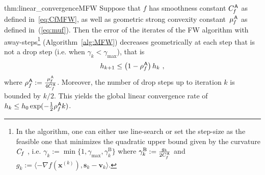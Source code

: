\documentclass{article} %
\newcommand{\stepsize}{\gamma}
\newcommand{\stepmax}{\stepsize_{\textrm{max}}} %
\newcommand{\stepbound}{\stepsize^\textrm{B}} %
\newcommand{\away}{{\hspace{0.06em}\textsf{A}}}
\newcommand{\Cf}{C_{\hspace{-0.08em}f}}
\newcommand{\CfMFW}{C_{\hspace{-0.08em}f}^\away}
\newcommand{\strongConvMFW}{\mu_{\hspace{-0.08em}f}^\away}
\newcommand{\x}{\bm{x}}
\newcommand{\s}{\bm{s}}
\newcommand{\vv}{\bm{v}} %
\newcommand{\0}{\mathbf{0}} %
\begin{document}
\begin{reptheorem}{thm:linear_convergenceMFW}
Suppose that $f$ has smoothness constant $\CfMFW$ as defined in~\eqref{eq:CfMFW}, as well as geometric strong convexity constant~$\strongConvMFW$ as defined in~(\ref{eq:muf}).
%
Then the error of the iterates of the FW algorithm with away-steps\footnote{%
In the algorithm, one can either use line-search or set the step-size as the feasible one that minimizes the quadratic upper bound given by the curvature $\Cf$%
, i.e. $\stepsize_k := \min\{1,\stepmax, \stepbound_k\}$ where $\stepbound_k := \frac{g_k}{2\CfMFW}$ and\vspace{-2mm} $g_k :=  \langle  -\nabla f(\x^{(k)}), \s_k - \vv_k \rangle$.
}
%
(Algorithm~\ref{alg:MFW})
decreases geometrically at each step that is not a drop step (i.e. when $\stepsize_k < \stepmax$), that is\vspace{-1mm}
\[
h_{k+1} \leq \left(1-\rho_f^\away\right) h_k \ ,\vspace{-1mm}
\]
where $\rho_f^\away := \frac{\strongConvMFW}{4\CfMFW}$. 
%
Moreover, the number of drop steps up to iteration $k$ is bounded by $k/2$. %
This yields the global linear convergence rate of $h_k \leq h_0 \exp(-\frac12 \rho_f^\away k)$.
%
\end{reptheorem}
\end{document}

